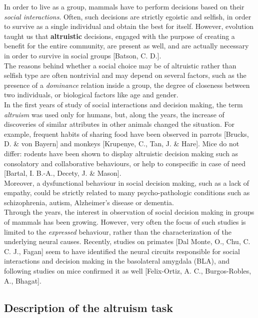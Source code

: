 \documentclass[a4paper]{article}
\begin{document}
In order to live as a group, mammals have to perform decisions based on their \textit{social interactions}. Often, such decisions are strictly egoistic and selfish, in order to survive as a single individual and obtain the best for itself. However, evolution taught us that \textbf{altruistic} decisions, engaged with the purpose of creating a benefit for the entire community, are present as well, and are actually necessary in order to survive in social groups [Batson, C. D.].\\
The reasons behind whether a social choice may be of altruistic rather than selfish type are often nontrivial and may depend on several factors, such as the presence of a \textit{dominance} relation inside a group, the degree of closeness between two individuals, or biological factors like age and gender.\\
In the first years of study of social interactions and decision making, the term \textit{altruism} was used only for humans, but, along the years, the increase of discoveries of similar attributes in other animals changed the situation. For example, frequent habits of sharing food have been observed in parrots [Brucks, D. \& von Bayern] and monkeys [Krupenye, C., Tan, J. \& Hare]. Mice do not differ: rodents have been shown to display altruistic decision making such as consolatory and collaborative behaviours, or help to conspecific in case of need [Bartal, I. B.-A., Decety, J. \& Mason]. \\
Moreover, a dysfunctional behaviour in social decision making, such as a lack of empathy, could be strictly related to many psycho-pathologic conditions such as schizophrenia, autism, Alzheimer's disease or dementia. \\
Through the years, the interest in observation of social decision making in groups of mammals has been growing. However, very often the focus of such studies is limited to the \textit{expressed} behaviour, rather than the characterization of the underlying neural causes. Recently, studies on primates [Dal Monte, O., Chu, C. C. J., Fagan] seem to have identified the neural circuits responsible for social interactions and decision making in the basolateral amygdala (BLA), and following studies on mice confirmed it as well [Felix-Ortiz, A. C., Burgos-Robles, A., Bhagat].

\subsection{Description of the altruism task}
\end{document}
